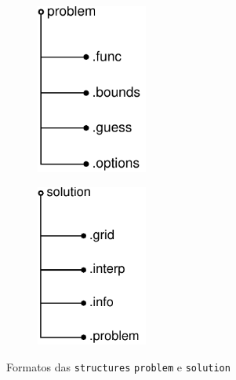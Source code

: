 \begin{figure}[H]
    \centering
    \begin{subfigure}{0.48\linewidth}
    \centering
        \includegraphics[width=0.4\textwidth]{Cap3/structures-problem.pdf}
    \end{subfigure}
    \hfill
    \begin{subfigure}{0.48\linewidth}
    \centering
        \includegraphics[width=0.4\textwidth]{Cap3/structures-solution.pdf}
    \end{subfigure}
    \caption{Formatos das \texttt{structures} \texttt{problem} e \texttt{solution}}
    \label{fig:structures}
\end{figure}






